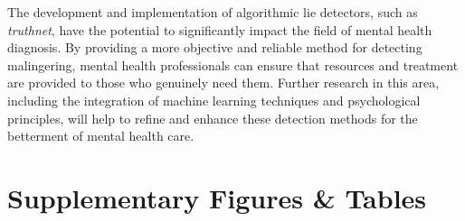 \documentclass[onecolumn, compsoc,10pt]{IEEEtran}
\begin{document}
The development and implementation of algorithmic lie detectors, such as \textit{truthnet}, have the potential to significantly impact the field of mental health diagnosis. By providing a more objective and reliable method for detecting malingering, mental health professionals can
ensure that resources and treatment are provided to those who genuinely need them. Further research in this area, including the integration of machine learning techniques and psychological principles, will help to refine and enhance these detection methods for the betterment of mental health care.







\clearpage                                                                      
\setcounter{figure}{0}
\renewcommand{\figurename}{Extended Data Figure}                               
\setcounter{table}{0}                                     
\renewcommand{\tablename}{Extended Data Table}                                 
%

\clearpage



\section*{Supplementary Figures \& Tables}

%
\end{document}

